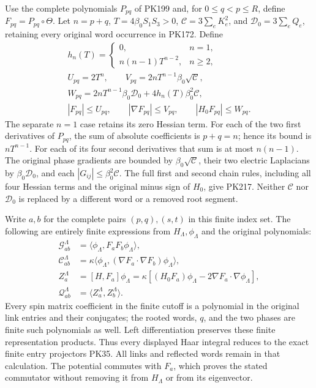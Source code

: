 \documentclass[11pt]{article}
\begin{document}
Use the complete polynomials \(P_{pq}\) of PK199 and, for
\(0\le q<p\le R\), define \(F_{pq}=P_{pq}\circ\Theta\).
Let \(n=p+q\), \(T=4\beta_0S_1S_3>0\),
\(\mathcal C=3\sum_eK_e^2\), and
\(\mathcal D_0=3\sum_eQ_e\), retaining every original word
occurrence in PK172. Define
\[
 \begin{gathered}
 h_n(T)=
 \begin{cases}0,&n=1,\\ n(n-1)T^{n-2},&n\ge2,\end{cases}\\
 U_{pq}=2T^n,\qquad
 V_{pq}=2nT^{n-1}\beta_0\sqrt{\mathcal C},\\
 W_{pq}=2nT^{n-1}\beta_0\mathcal D_0
                     +4h_n(T)\beta_0^2\mathcal C,\\
 |F_{pq}|\le U_{pq},\qquad
 |\nabla F_{pq}|\le V_{pq},\qquad
 |H_0F_{pq}|\le W_{pq}.
 \end{gathered}\tag{PK217}
\]
The separate \(n=1\) case retains its zero Hessian term.
For each of the two first derivatives of \(P_{pq}\), the sum
of absolute coefficients is \(p+q=n\); hence its bound is
\(nT^{n-1}\). For each of its four second derivatives that
sum is at most \(n(n-1)\). The original phase gradients
are bounded by \(\beta_0\sqrt{\mathcal C}\), their two
electric Laplacians by \(\beta_0\mathcal D_0\), and each
\(|G_{ij}|\le\beta_0^2\mathcal C\).
The full first and second chain rules, including all four
Hessian terms and the original minus sign of \(H_0\), give
PK217. Neither \(\mathcal C\) nor \(\mathcal D_0\) is replaced
by a different word or a removed root segment.

Write \(a,b\) for the complete pairs \((p,q),(s,t)\) in this
finite index set. The following are entirely finite
expressions from \(H_\Lambda,\phi_\Lambda\) and the original
polynomials:
\[
 \begin{split}
 \mathcal G^\Lambda_{ab}
   &=\langle\phi_\Lambda,F_aF_b\phi_\Lambda\rangle,\\
 \mathcal C^\Lambda_{ab}
   &=\kappa\langle\phi_\Lambda,
                    (\nabla F_a\cdot\nabla F_b)\phi_\Lambda\rangle,\\
 Z^\Lambda_a&=[H,F_a]\phi_\Lambda
       =\kappa\left[(H_0F_a)\phi_\Lambda
                            -2\nabla F_a\cdot\nabla\phi_\Lambda\right],\\
 \mathcal Q^\Lambda_{ab}
   &=\langle Z^\Lambda_a,Z^\Lambda_b\rangle .
 \end{split}\tag{PK218}
\]
Every spin matrix coefficient in the finite cutoff is a
polynomial in the original link entries and their conjugates;
the rooted words, \(q\), and the two phases are finite such
polynomials as well. Left differentiation preserves these
finite representation products. Thus every displayed Haar
integral reduces to the exact finite entry projectors PK35.
All links and reflected words remain in that calculation.
The potential commutes with \(F_a\), which proves the stated
commutator without removing it from \(H_\Lambda\) or from
its eigenvector.
\end{document}
